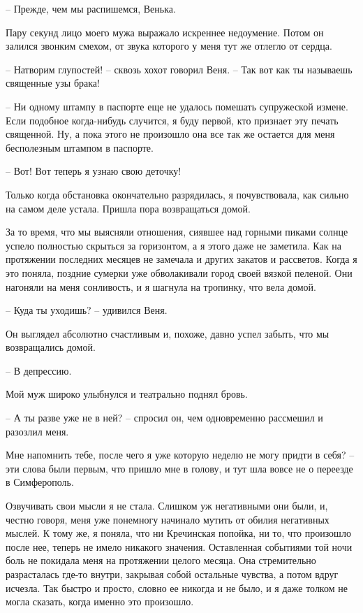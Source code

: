 \documentclass[
]{book}
\begin{document}
-- Прежде, чем мы распишемся, Венька.

Пару секунд лицо моего мужа выражало искреннее недоумение. Потом он залился звонким смехом, от звука которого у меня тут же отлегло от сердца.

-- Натворим глупостей! -- сквозь хохот говорил Веня. -- Так вот как ты называешь священные узы брака!

-- Ни одному штампу в паспорте еще не удалось помешать супружеской измене. Если подобное когда-нибудь случится, я буду первой, кто признает эту печать священной. Ну, а пока этого не произошло она все так же остается для меня бесполезным штампом в паспорте.

-- Вот! Вот теперь я узнаю свою деточку!

Только когда обстановка окончательно разрядилась, я почувствовала, как сильно на самом деле устала. Пришла пора возвращаться домой.

За то время, что мы выясняли отношения, сиявшее над горными пиками солнце успело полностью скрыться за горизонтом, а я этого даже не заметила. Как на протяжении последних месяцев не замечала и других закатов и рассветов. Когда я это поняла, поздние сумерки уже обволакивали город своей вязкой пеленой. Они нагоняли на меня сонливость, и я шагнула на тропинку, что вела домой.

-- Куда ты уходишь? -- удивился Веня.

Он выглядел абсолютно счастливым и, похоже, давно успел забыть, что мы возвращались домой.

-- В депрессию.

Мой муж широко улыбнулся и театрально поднял бровь.

-- А ты разве уже не в ней? -- спросил он, чем одновременно рассмешил и разозлил меня.

Мне напомнить тебе, после чего я уже которую неделю не могу придти в себя? -- эти слова были первым, что пришло мне в голову, и тут шла вовсе не о переезде в Симферополь.

Озвучивать свои мысли я не стала. Слишком уж негативными они были, и, честно говоря, меня уже понемногу начинало мутить от обилия негативных мыслей. К тому же, я поняла, что ни Кречинская попойка, ни то, что произошло после нее, теперь не имело никакого значения. Оставленная событиями той ночи боль не покидала меня на протяжении целого месяца. Она стремительно разрасталась где-то внутри, закрывая собой остальные чувства, а потом вдруг исчезла. Так быстро и просто, словно ее никогда и не было, и я даже толком не могла сказать, когда именно это произошло.
\end{document}
